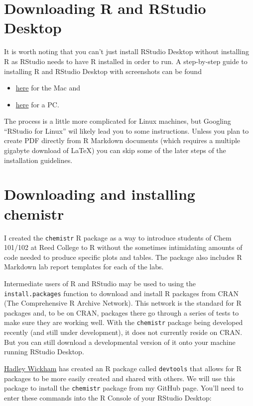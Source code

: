 \documentclass[]{tufte-book}
\providecommand{\tightlist}{%
  \setlength{\itemsep}{0pt}\setlength{\parskip}{0pt}}
\begin{document}
\section{Downloading R and RStudio
Desktop}\label{downloading-r-and-rstudio-desktop}

It is worth noting that you can't just install RStudio Desktop without
installing R as RStudio needs to have R installed in order to run. A
step-by-step guide to installing R and RStudio Desktop with screenshots
can be found

\begin{itemize}
\tightlist
\item
  \href{http://www.reed.edu/data-at-reed/software/R/r_studio.html}{here}
  for the Mac and
\item
  \href{http://www.reed.edu/data-at-reed/software/R/r_studio_pc.html}{here}
  for a PC.
\end{itemize}

The process is a little more complicated for Linux machines, but
Googling ``RStudio for Linux'' wil likely lead you to some instructions.
Unless you plan to create PDF directly from R Markdown documents (which
requires a multiple gigabyte download of LaTeX) you can skip some of the
later steps of the installation guidelines.

\section{Downloading and installing
chemistr}\label{downloading-and-installing-chemistr}

I created the \texttt{chemistr} R package as a way to introduce students
of Chem 101/102 at Reed College to R without the sometimes intimidating
amounts of code needed to produce specific plots and tables. The package
also includes R Markdown lab report templates for each of the labs.

Intermediate users of R and RStudio may be used to using the
\texttt{install.packages} function to download and install R packages
from CRAN (The Comprehensive R Archive Network). This network is the
standard for R packages and, to be on CRAN, packages there go through a
series of tests to make sure they are working well. With the
\texttt{chemistr} package being developed recently (and still under
development), it does not currently reside on CRAN. But you can still
download a developmental version of it onto your machine running RStudio
Desktop.

\href{http://hadley.nz/}{Hadley Wickham} has created an R package called
\texttt{devtools} that allows for R packages to be more easily created
and shared with others. We will use this package to install the
\texttt{chemistr} package from my GitHub page. You'll need to enter
these commands into the R Console of your RStudio Desktop:
\end{document}
